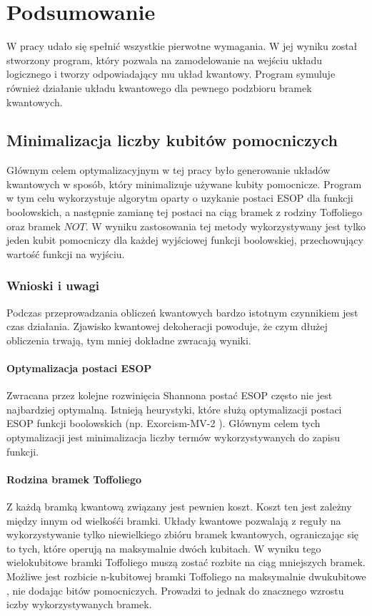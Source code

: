 \chapter{Podsumowanie}
\thispagestyle{chapterBeginStyle}
W pracy udało się spełnić wszystkie pierwotne wymagania. W jej wyniku został stworzony program, który pozwala na zamodelowanie na wejściu układu logicznego i tworzy odpowiadający mu układ kwantowy. Program symuluje również działanie układu kwantowego dla pewnego podzbioru bramek kwantowych.
\section{Minimalizacja liczby kubitów pomocniczych}
Głównym celem optymalizacyjnym w tej pracy było generowanie układów kwantowych w sposób, który minimalizuje używane kubity pomocnicze. Program w tym celu wykorzystuje algorytm oparty o uzykanie postaci ESOP dla funkcji boolowskich, a następnie zamianę tej postaci na ciąg bramek z rodziny Toffoliego oraz bramek $NOT$. W wyniku zastosowania tej metody wykorzystywany jest tylko jeden kubit pomocniczy dla każdej wyjściowej funkcji boolowskiej, przechowujący wartość funkcji na wyjściu.
\subsection{Wnioski i uwagi}
Podczas przeprowadzania obliczeń kwantowych bardzo istotnym czynnikiem jest czas działania. Zjawisko kwantowej dekoheracji powoduje, że czym dłużej obliczenia trwają, tym mniej dokładne zwracają wyniki.
\subsubsection{Optymalizacja postaci ESOP}
Zwracana przez kolejne rozwinięcia Shannona postać ESOP często nie jest najbardziej optymalną. Istnieją heurystyki, które służą optymalizacji postaci ESOP funkcji boolowskich (np. Exorcism-MV-2 \cite{Exorcism2}). Głównym celem tych optymalizacji jest minimalizacja liczby termów wykorzystywanych do zapisu funkcji.
\subsubsection{Rodzina bramek Toffoliego}
Z każdą bramką kwantową związany jest pewnien koszt. Koszt ten jest zależny między innym od wielkośći bramki. Układy kwantowe pozwalają z reguły na wykorzystywanie tylko niewielkiego zbióru bramek kwantowych, ograniczając się to tych, które operują na maksymalnie dwóch kubitach. W wyniku tego wielokubitowe bramki Toffoliego muszą zostać rozbite na ciąg mniejszych bramek. Możliwe jest rozbicie n-kubitowej bramki Toffoliego na maksymalnie dwukubitowe \cite{Saeedi_2013}, nie dodając bitów pomocniczych. Prowadzi to jednak do znacznego wzrostu iczby wykorzystywanych bramek.
